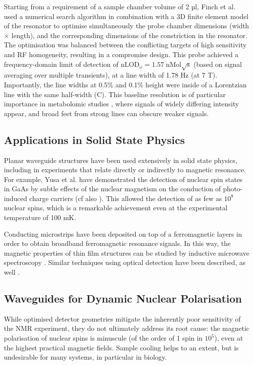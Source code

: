 Starting
from a requirement of a sample chamber volume of 2 µl, Finch et al. used
a numerical search algorithm in combination with a 3D finite element
model of the resonator to optimise simultaneously the probe chamber
dimensions (width $\times$ length), and the corresponding dimensions of the
constriction in the resonator. The optimisation was balanced between the
conflicting targets of high sensitivity and RF homogeneity, resulting in
a compromise design. This probe achieved a frequency-domain limit of
detection of $\text{nLOD}_\omega = 1.57\;\mathrm{nMol \sqrt{s}}$ (based on signal averaging over
multiple transients), at a line width of 1.78 Hz (at 7 T). Importantly,
the line widths at 0.5\% and 0.1\% height were inside of a Lorentzian
line with the same half-width (C). This baseline resolution is of particular
importance in metabolomic studies \cite{pan2007cac,Zhang:2010kf}, where
signals of widely differing intensity appear, and broad feet from strong
lines can obscure weaker signals. 

\subsection{Applications in Solid State Physics}

Planar
waveguide structures have been used extensively in solid state physics,
including in experiments that relate directly or indirectly to magnetic
resonance. For example, Yusa et al. have demonstrated the detection of
nuclear spin states in GaAs by subtle effects of the nuclear magnetism
on the conduction of photo-induced charge carriers \cite{Yusa:2005iy} (cf
also \cite{Tycko:2005kj}). This allowed the detection of as few as $10^8$
nuclear spins, which is a remarkable achievement even at the
experimental temperature of 100 mK. 

Conducting microstrips have been
deposited on top of a ferromagnetic layers in order to obtain broadband
ferromagnetic resonance signals. In this way, the magnetic properties of
thin film structures can be studied by inductive microwave spectroscopy
\cite{Kostylev:2009ia,Kostylev:2010fy}. Similar techniques using optical
detection have been described, as well \cite{Keatley:2005by}. 


\subsection{Waveguides for Dynamic Nuclear Polarisation}
While optimised detector
geometries mitigate the inherently poor sensitivity of the NMR
experiment, they do not ultimately address its root cause: the magnetic
polarisation of nuclear spins is minuscule (of the order of 1 spin in $10^5$),
even at the highest practical magnetic fields. Sample cooling helps to
an extent, but is undesirable for many systems, in particular
in biology. 

